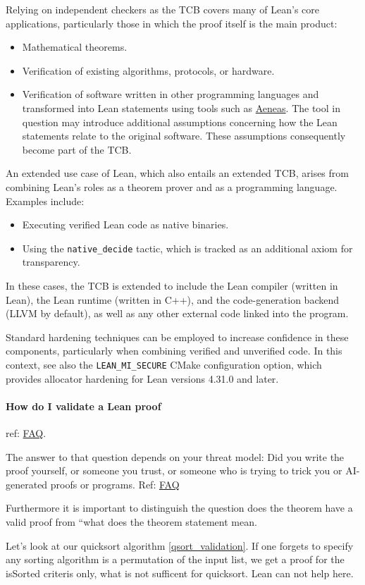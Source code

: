 Relying on independent checkers as the TCB covers many of Lean's 
core applications, particularly those in which the proof itself 
is the main product:

\begin{itemize}
    \item Mathematical theorems.
    \item Verification of existing algorithms, protocols, or hardware.
    \item Verification of software written in other programming 
    languages and transformed into Lean statements using tools 
    such as \href{https://github.com/AeneasVerif/aeneas}{Aeneas}.
    The tool in question may introduce additional assumptions 
    concerning how the Lean statements relate to the original 
    software. These assumptions consequently become part of the TCB.
\end{itemize}

An extended use case of Lean, which also entails an extended TCB, 
arises from combining Lean's roles as a theorem prover and as a 
programming language. Examples include:

\begin{itemize}
    \item Executing verified Lean code as native binaries.
    \item Using the \texttt{native\_decide} tactic, which is tracked 
    as an additional axiom for transparency.
\end{itemize}

In these cases, the TCB is extended to include the Lean compiler 
(written in Lean), the Lean runtime (written in C++), and the 
code-generation backend (LLVM by default), as well as any other 
external code linked into the program.

Standard hardening techniques can be employed to increase 
confidence in these components, particularly when combining 
verified and unverified code. In this context, see also the 
\texttt{LEAN\_MI\_SECURE} CMake configuration option, which 
provides allocator hardening for Lean versions 4.31.0 and later.

\paragraph{How do I validate a Lean proof}
ref: \href{https://lean-lang.org/faq/#validation}{FAQ}.

The answer to that question depends on your threat model: Did you write the proof yourself, or someone you trust, or someone who is trying to trick you or AI-generated proofs or programs. Ref: \href{https://lean-lang.org/doc/reference/latest/find/?domain=Verso.Genre.Manual.section&name=validating-proofs}{FAQ}

Furthermore it is important to distinguish the question does the theorem have a valid proof from “what does the theorem statement mean. 

Let's look at our quicksort algorithm \ref{qsort_validation}. If one forgets to specify any sorting algorithm is a permutation of the input list, we get a proof for the isSorted criteris only, what is not sufficent for quicksort. Lean can not help here.  


